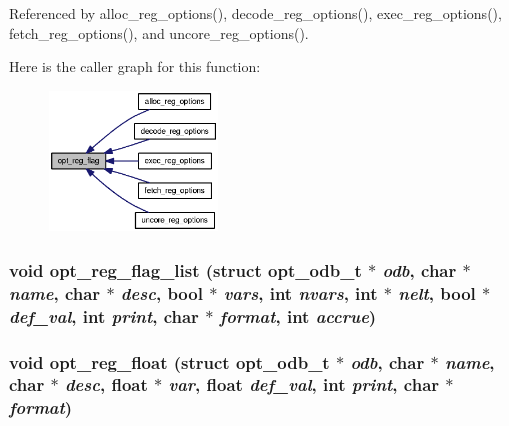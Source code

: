 Referenced by alloc\_\-reg\_\-options(), decode\_\-reg\_\-options(), exec\_\-reg\_\-options(), fetch\_\-reg\_\-options(), and uncore\_\-reg\_\-options().

Here is the caller graph for this function:\nopagebreak
\begin{figure}[H]
\begin{center}
\leavevmode
\includegraphics[width=127pt]{options_8h_67bace6ae10ed0ee002a5efb379ba300_icgraph}
\end{center}
\end{figure}
\subsubsection[{opt\_\-reg\_\-flag\_\-list}]{\setlength{\rightskip}{0pt plus 5cm}void opt\_\-reg\_\-flag\_\-list (struct {\bf opt\_\-odb\_\-t} $\ast$ {\em odb}, \/  char $\ast$ {\em name}, \/  char $\ast$ {\em desc}, \/  bool $\ast$ {\em vars}, \/  int {\em nvars}, \/  int $\ast$ {\em nelt}, \/  bool $\ast$ {\em def\_\-val}, \/  int {\em print}, \/  char $\ast$ {\em format}, \/  int {\em accrue})}\label{options_8h_51490d3edc932834af7604128f3bd25c}


\subsubsection[{opt\_\-reg\_\-float}]{\setlength{\rightskip}{0pt plus 5cm}void opt\_\-reg\_\-float (struct {\bf opt\_\-odb\_\-t} $\ast$ {\em odb}, \/  char $\ast$ {\em name}, \/  char $\ast$ {\em desc}, \/  float $\ast$ {\em var}, \/  float {\em def\_\-val}, \/  int {\em print}, \/  char $\ast$ {\em format})}\label{options_8h_c15111fd41a8f520e56180ce7677e6ce}


